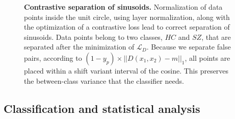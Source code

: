\documentclass[pdflatex,referee,sn-basic]{sn-jnl}%
\begin{document}
\begin{figure}[ht]
\begin{tikzpicture}
        
    \end{tikzpicture}
    \caption{\textbf{Contrastive separation of sinusoids.} Normalization of data points inside the unit circle, using layer normalization, along with the optimization of a contrastive loss lead to correct separation of sinusoids. Data points belong to two classes, $HC$ and $SZ$, that are separated after the minimization of $\mathcal{L}_D$. Because we separate false pairs, according to $(1-y_p) \times ||D(x_1,x_2)-m||_1$, all points are placed within a shift variant interval of the cosine. This preserves the between-class variance that the classifier needs.}
    \label{fig:sinusoid_separation}
\end{figure}

\subsection{Classification and statistical analysis}\label{section:setting}
\end{document}
